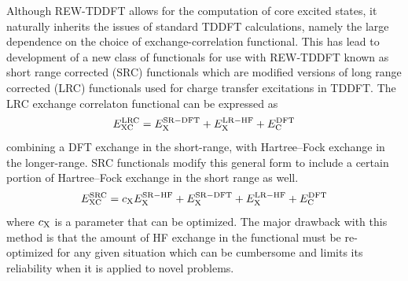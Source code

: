 \documentclass[final]{emory}
\begin{document}
Although REW-TDDFT allows for the computation of core excited states, it naturally inherits the issues of standard TDDFT calculations, namely the large dependence on the choice of exchange-correlation functional. This has lead to development of a new class of functionals for use with REW-TDDFT known as short range corrected (SRC) functionals which are modified versions of long range corrected (LRC) functionals used for charge transfer excitations in TDDFT. The LRC exchange correlaton functional can be expressed as
\begin{equation}
E^{\rm LRC}_{\rm XC} = E^{\rm SR-DFT}_{\rm X} + E^{\rm LR-HF}_{\rm X} + E^{\rm DFT}_{\rm C} 
\end{equation}
combining a DFT exchange in the short-range, with Hartree--Fock exchange in the longer-range. SRC functionals modify this general form to include a certain portion of Hartree--Fock exchange in the short range as well.
\begin{equation}
E^{\rm SRC}_{\rm XC} = c_{\rm X}E^{\rm SR-HF}_{\rm X} + E^{\rm SR-DFT}_{\rm X} + E^{\rm LR-HF}_{\rm X} + E^{\rm DFT}_{\rm C} 
\end{equation}
where $c_{\rm X}$ is a parameter that can be optimized. The major drawback with this method is that the amount of HF exchange in the functional must be re-optimized for any given situation which can be cumbersome and limits its reliability when it is applied to novel problems. 
\end{document}
